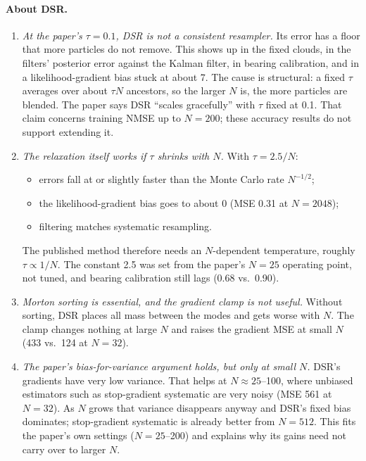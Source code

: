 \paragraph{About DSR.}
\begin{enumerate}
\item \emph{At the paper's $\tau{=}0.1$, DSR is not a consistent resampler.} Its error has a floor that more particles do not remove. This shows up in the fixed clouds, in the filters' posterior error against the Kalman filter, in bearing calibration, and in a likelihood-gradient bias stuck at about 7. The cause is structural: a fixed $\tau$ averages over about $\tau N$ ancestors, so the larger $N$ is, the more particles are blended. The paper says DSR ``scales gracefully'' with $\tau$ fixed at 0.1. That claim concerns training NMSE up to $N{=}200$; these accuracy results do not support extending it.
\item \emph{The relaxation itself works if $\tau$ shrinks with $N$.} With $\tau{=}2.5/N$:
  \begin{itemize}
  \item errors fall at or slightly faster than the Monte Carlo rate $N^{-1/2}$;
  \item the likelihood-gradient bias goes to about 0 (MSE 0.31 at $N{=}2048$);
  \item filtering matches systematic resampling.
  \end{itemize}
  The published method therefore needs an $N$-dependent temperature, roughly $\tau\propto1/N$. The constant 2.5 was set from the paper's $N{=}25$ operating point, not tuned, and bearing calibration still lags (0.68 vs.\ 0.90).
\item \emph{Morton sorting is essential, and the gradient clamp is not useful.} Without sorting, DSR places all mass between the modes and gets worse with $N$. The clamp changes nothing at large $N$ and raises the gradient MSE at small $N$ (433 vs.\ 124 at $N{=}32$).
\item \emph{The paper's bias-for-variance argument holds, but only at small $N$.} DSR's gradients have very low variance. That helps at $N\approx25$--100, where unbiased estimators such as stop-gradient systematic are very noisy (MSE 561 at $N{=}32$). As $N$ grows that variance disappears anyway and DSR's fixed bias dominates; stop-gradient systematic is already better from $N{=}512$. This fits the paper's own settings ($N{=}25$--200) and explains why its gains need not carry over to larger $N$.
\end{enumerate}

